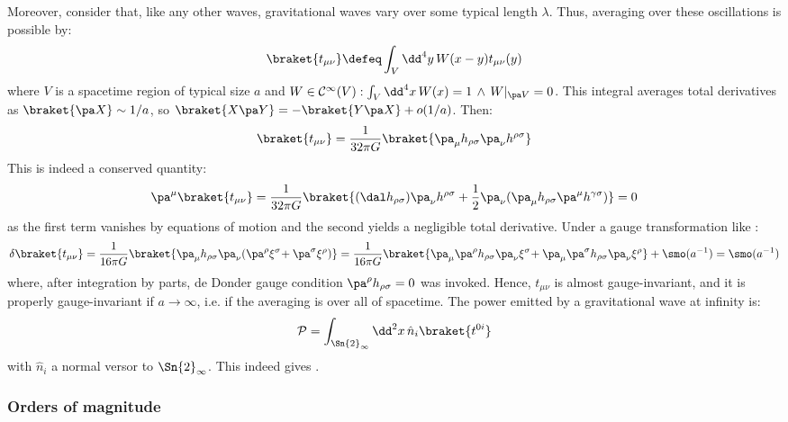 Moreover, consider that, like any other waves, gravitational waves vary over some typical length $ \lambda $. Thus, averaging over these oscillations is possible by:
\begin{equation*}
  \braket{t_{\mu \nu}} \defeq \int_V \dd^4 y\, W(x - y) t_{\mu \nu}(y)
\end{equation*}
where $ V $ is a spacetime region of typical size $ a $ and $ W \in \mathcal{C}^{\infty}(V) : \int_V \dd^4 x\, W(x) = 1 \,\land\, W\vert_{\pa V} = 0 $. This integral averages total derivatives as $ \braket{\pa X} \sim 1/a $, so $ \braket{X \pa Y} = - \braket{Y \pa X} + o(1/a) $. Then:
\begin{equation}
  \braket{t_{\mu \nu}} = \frac{1}{32\pi G} \braket{\pa_\mu h_{\rho \sigma} \pa_\nu h^{\rho \sigma}}
\end{equation}
This is indeed a conserved quantity:
\begin{equation*}
  \pa^\mu \braket{t_{\mu \nu}} = \frac{1}{32\pi G} \braket{(\dal h_{\rho \sigma}) \pa_\nu h^{\rho \sigma} + \frac{1}{2} \pa_\nu (\pa_\mu h_{\rho \sigma} \pa^\mu h^{\gamma \sigma})} = 0
\end{equation*}
as the first term vanishes by equations of motion and the second yields a negligible total derivative. Under a gauge transformation like :
\begin{equation*}
  \delta \braket{t_{\mu \nu}} = \frac{1}{16\pi G} \braket{\pa_\mu h_{\rho \sigma} \pa_\nu (\pa^\rho \xi^\sigma \hspace{-0.2em} + \pa^\sigma \xi^\rho)} = \frac{1}{16\pi G} \braket{\pa_\mu \pa^\rho h_{\rho \sigma} \pa_\nu \xi^\sigma \hspace{-0.2em} + \pa_\mu \pa^\sigma h_{\rho \sigma} \pa_\nu \xi^\rho} + \smo(a^{-1}) = \smo(a^{-1})
\end{equation*}
where, after integration by parts, de Donder gauge condition $ \pa^\rho h_{\rho \sigma} = 0 $ was invoked. Hence, $ t_{\mu \nu} $ is almost gauge-invariant, and it is properly gauge-invariant if $ a \rightarrow \infty $, i.e. if the averaging is over all of spacetime. The power emitted by a gravitational wave at infinity is:
\begin{equation*}
  \mathcal{P} = \int_{\Sn{2}_{\infty}} \dd^2 x\, \hat{n}_i \braket{t^{0i}}
\end{equation*}
with $ \hat{n}_i $ a normal versor to $ \Sn{2}_{\infty} $. This indeed gives .

\subsubsection{Orders of magnitude}

